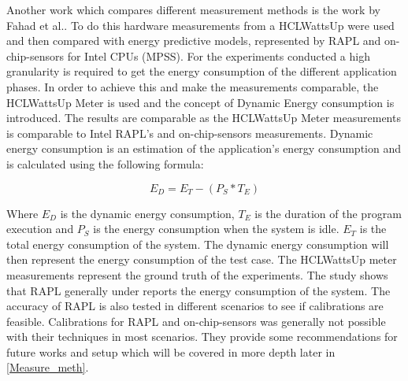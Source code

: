 
Another work which compares different measurement methods is the work by Fahad et al.\cite{fahad2019comparative}. To do this hardware measurements from a HCLWattsUp were used and then compared with energy predictive models, represented by RAPL and on-chip-sensors for Intel CPUs (MPSS). For the experiments conducted a high granularity is required to get the energy consumption of the different application phases. In order to achieve this and make the measurements comparable, the HCLWattsUp Meter is used and the concept of Dynamic Energy consumption is introduced. The results are comparable as the HCLWattsUp Meter measurements is comparable to Intel RAPL's and on-chip-sensors measurements. Dynamic energy consumption is an estimation of the application's energy consumption and is calculated using the following formula:\cite{fahad2019comparative}

\begin{equation}
    E_D = E_T - (P_S * T_E)
\end{equation}

Where $E_D$ is the dynamic energy consumption, $T_E$ is the duration of the program execution and $P_S$ is the energy consumption when the system is idle. $E_T$ is the total energy consumption of the system. The dynamic energy consumption will then represent the energy consumption of the test case. The HCLWattsUp meter measurements represent the ground truth of the experiments. The study shows that RAPL generally under reports the energy consumption of the system. The accuracy of RAPL is also tested in different scenarios to see if calibrations are feasible. Calibrations for RAPL and on-chip-sensors was generally not possible with their techniques in most scenarios. They provide some recommendations for future works and setup which will be covered in more depth later in \ref{Measure_meth}.